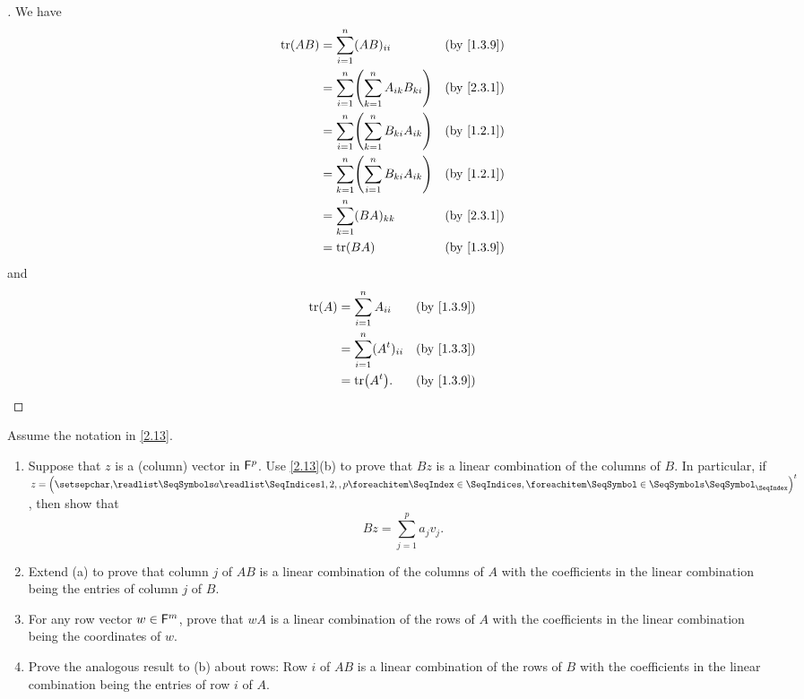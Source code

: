 \begin{proof}[]
  We have
  \begin{align*}
    \tr[AB] & = \sum_{i = 1}^n (AB)_{i i}                          &  & \text{(by \cref{1.3.9})} \\
            & = \sum_{i = 1}^n \pa{\sum_{k = 1}^n A_{i k} B_{k i}} &  & \text{(by \cref{2.3.1})} \\
            & = \sum_{i = 1}^n \pa{\sum_{k = 1}^n B_{k i} A_{i k}} &  & \text{(by \cref{1.2.1})} \\
            & = \sum_{k = 1}^n \pa{\sum_{i = 1}^n B_{k i} A_{i k}} &  & \text{(by \cref{1.2.1})} \\
            & = \sum_{k = 1}^n (BA)_{k k}                          &  & \text{(by \cref{2.3.1})} \\
            & = \tr[BA]                                            &  & \text{(by \cref{1.3.9})}
  \end{align*}
  and
  \begin{align*}
    \tr[A] & = \sum_{i = 1}^n A_{i i}        &  & \text{(by \cref{1.3.9})} \\
           & = \sum_{i = 1}^n (\tp{A})_{i i} &  & \text{(by \cref{1.3.3})} \\
           & = \tr[\tp{A}].                  &  & \text{(by \cref{1.3.9})}
  \end{align*}
\end{proof}

\begin{ex}\label{ex:2.3.14}
  Assume the notation in \cref{2.13}.
  \begin{enumerate}
    \item Suppose that \(z\) is a (column) vector in \(\mathsf{F}^p\).
          Use \cref{2.13}(b) to prove that \(Bz\) is a linear combination of the columns of \(B\).
          In particular, if \(z = \tp{\tuple{a}{1,2,,p}}\), then show that
          \[
            Bz = \sum_{j = 1}^p a_j v_j.
          \]
    \item Extend (a) to prove that column \(j\) of \(AB\) is a linear combination of the columns of \(A\) with the coefficients in the linear combination being the entries of column \(j\) of \(B\).
    \item For any row vector \(w \in \mathsf{F}^m\), prove that \(wA\) is a linear combination of the rows of \(A\) with the coefficients in the linear combination being the coordinates of \(w\).
    \item Prove the analogous result to (b) about rows:
          Row \(i\) of \(AB\) is a linear combination of the rows of \(B\) with the coefficients in the linear combination being the entries of row \(i\) of \(A\).
  \end{enumerate}
\end{ex}


